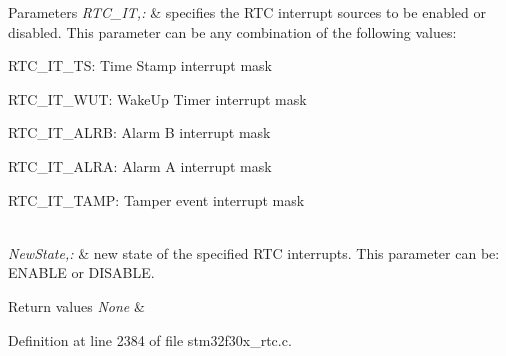\begin{DoxyParams}{Parameters}
{\em R\-T\-C\-\_\-\-I\-T,\-:} & specifies the R\-T\-C interrupt sources to be enabled or disabled. This parameter can be any combination of the following values\-: \begin{DoxyItemize}
\item R\-T\-C\-\_\-\-I\-T\-\_\-\-T\-S\-: Time Stamp interrupt mask \item R\-T\-C\-\_\-\-I\-T\-\_\-\-W\-U\-T\-: Wake\-Up Timer interrupt mask \item R\-T\-C\-\_\-\-I\-T\-\_\-\-A\-L\-R\-B\-: Alarm B interrupt mask \item R\-T\-C\-\_\-\-I\-T\-\_\-\-A\-L\-R\-A\-: Alarm A interrupt mask \item R\-T\-C\-\_\-\-I\-T\-\_\-\-T\-A\-M\-P\-: Tamper event interrupt mask \end{DoxyItemize}
\\
\hline
{\em New\-State,\-:} & new state of the specified R\-T\-C interrupts. This parameter can be\-: E\-N\-A\-B\-L\-E or D\-I\-S\-A\-B\-L\-E. \\
\hline
\end{DoxyParams}

\begin{DoxyRetVals}{Return values}
{\em None} & \\
\hline
\end{DoxyRetVals}


Definition at line 2384 of file stm32f30x\-\_\-rtc.\-c.

